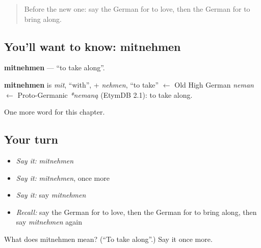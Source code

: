 \label{lesson:GE-C148-mitnehmen}



\begin{quote}
Before the new one: say the German for to love, then the German for to bring along.
\end{quote}

\subsection*{You'll want to know: mitnehmen}
\textbf{mitnehmen} — \textquotedblleft{}to take along\textquotedblright{}.

\begin{cousinweb}
\textbf{mitnehmen} is \emph{mit}, \textquotedblleft{}with\textquotedblright{}, + \emph{nehmen}, \textquotedblleft{}to take\textquotedblright{} $\leftarrow$ Old High German \emph{neman} $\leftarrow$ Proto-Germanic \emph{*nemaną} (EtymDB 2.1): to take along.
\end{cousinweb}

\begin{grammarlens}[title={What you've built}]
One more word for this chapter.
\end{grammarlens}

\subsection*{Your turn}
\begin{itemize}
\raggedright
  \item \emph{Say it:} \emph{mitnehmen}
  \item \emph{Say it:} \emph{mitnehmen}, once more
  \item \emph{Say it:} say \emph{mitnehmen}
  \item \emph{Recall:} say the German for to love, then the German for to bring along, then say \emph{mitnehmen} again
\end{itemize}

\begin{tcolorbox}[breakable,colback=teal!4,colframe=teal!35!black,title={Before you move on}]
What does mitnehmen mean? (\textquotedblleft{}To take along\textquotedblright{}.) Say it once more.
\end{tcolorbox}
